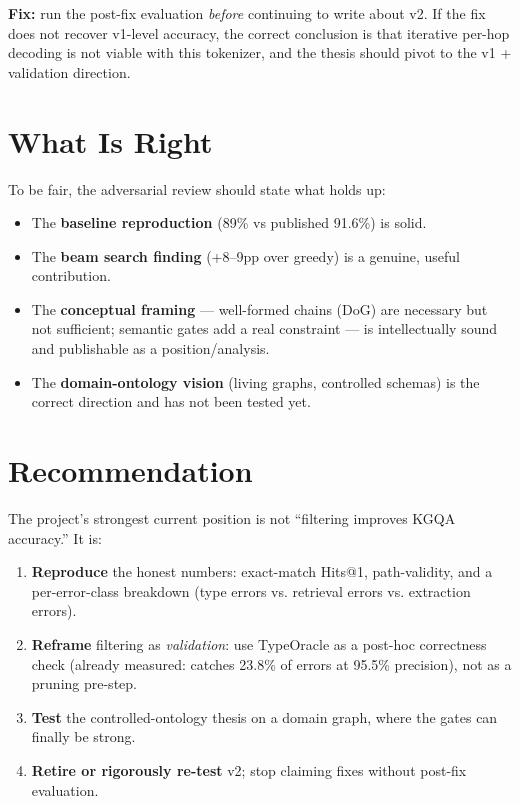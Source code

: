 \documentclass[11pt,a4paper]{article}
\begin{document}
\textbf{Fix:} run the post-fix evaluation \emph{before} continuing to
write about v2.  If the fix does not recover v1-level accuracy, the
correct conclusion is that iterative per-hop decoding is not viable
with this tokenizer, and the thesis should pivot to the v1 + validation
direction.

\section{What Is Right}

To be fair, the adversarial review should state what holds up:

\begin{itemize}
  \item The \textbf{baseline reproduction} (89\% vs published 91.6\%) is
    solid.
  \item The \textbf{beam search finding} (+8--9pp over greedy) is a
    genuine, useful contribution.
  \item The \textbf{conceptual framing} --- well-formed chains (DoG)
    are necessary but not sufficient; semantic gates add a real
    constraint --- is intellectually sound and publishable as a
    position/analysis.
  \item The \textbf{domain-ontology vision} (living graphs, controlled
    schemas) is the correct direction and has not been tested yet.
\end{itemize}

\section{Recommendation}

The project's strongest current position is not ``filtering improves
KGQA accuracy.''  It is:

\begin{enumerate}
  \item \textbf{Reproduce} the honest numbers: exact-match Hits@1,
    path-validity, and a per-error-class breakdown (type errors vs.
    retrieval errors vs. extraction errors).
  \item \textbf{Reframe} filtering as \emph{validation}: use TypeOracle
    as a post-hoc correctness check (already measured: catches 23.8\%
    of errors at 95.5\% precision), not as a pruning pre-step.
  \item \textbf{Test} the controlled-ontology thesis on a domain graph,
    where the gates can finally be strong.
  \item \textbf{Retire or rigorously re-test} v2; stop claiming fixes
    without post-fix evaluation.
\end{enumerate}
\end{document}
